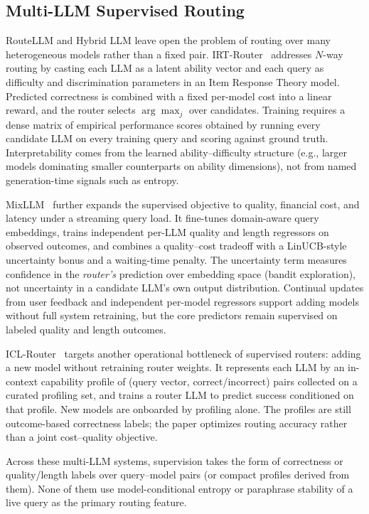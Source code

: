 \subsection{Multi-LLM Supervised Routing}

RouteLLM and Hybrid LLM leave open the problem of routing over many heterogeneous models rather than a fixed pair.
IRT-Router~\cite{song2025irt} addresses $N$-way routing by casting each LLM as a latent ability vector and each query as difficulty and discrimination parameters in an Item Response Theory model.
Predicted correctness is combined with a fixed per-model cost into a linear reward, and the router selects $\arg\max_j$ over candidates.
Training requires a dense matrix of empirical performance scores obtained by running every candidate LLM on every training query and scoring against ground truth.
Interpretability comes from the learned ability--difficulty structure (e.g., larger models dominating smaller counterparts on ability dimensions), not from named generation-time signals such as entropy.

MixLLM~\cite{wang2025mixllm} further expands the supervised objective to quality, financial cost, and latency under a streaming query load.
It fine-tunes domain-aware query embeddings, trains independent per-LLM quality and length regressors on observed outcomes, and combines a quality--cost tradeoff with a LinUCB-style uncertainty bonus and a waiting-time penalty.
The uncertainty term measures confidence in the \emph{router's} prediction over embedding space (bandit exploration), not uncertainty in a candidate LLM's own output distribution.
Continual updates from user feedback and independent per-model regressors support adding models without full system retraining, but the core predictors remain supervised on labeled quality and length outcomes.

ICL-Router~\cite{wang2025icl} targets another operational bottleneck of supervised routers: adding a new model without retraining router weights.
It represents each LLM by an in-context capability profile of (query vector, correct/incorrect) pairs collected on a curated profiling set, and trains a router LLM to predict success conditioned on that profile.
New models are onboarded by profiling alone.
The profiles are still outcome-based correctness labels; the paper optimizes routing accuracy rather than a joint cost--quality objective.

Across these multi-LLM systems, supervision takes the form of correctness or quality/length labels over query--model pairs (or compact profiles derived from them).
None of them use model-conditional entropy or paraphrase stability of a live query as the primary routing feature.

